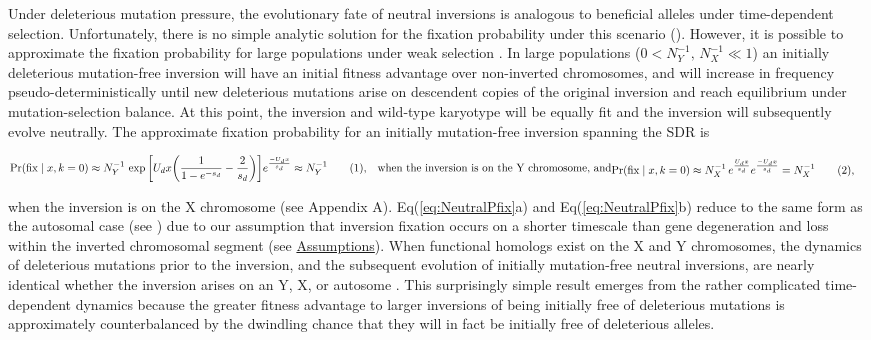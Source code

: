 \documentclass{article}
\newcommand\numberthis{\addtocounter{equation}{1}\tag{\theequation}}
\begin{document}
Under deleterious mutation pressure, the evolutionary fate of neutral inversions is analogous to beneficial alleles under time-dependent selection. Unfortunately, there is no simple analytic solution for the fixation probability under this scenario (\citealt{OhtaKojima1968, KimuraOhta1970, UeckerHermisson2011, Waxman2011}). However, it is possible to approximate the fixation probability for large populations under weak selection \citep{ConnallonOlito2020}. In large populations ($0 < N_Y^{-1},\, N_X^{-1} \ll 1$) an initially deleterious mutation-free inversion will have an initial fitness advantage over non-inverted chromosomes, and will increase in frequency pseudo-deterministically until new deleterious mutations arise on descendent copies of the original inversion and reach equilibrium under mutation-selection balance. At this point, the inversion and wild-type karyotype will be equally fit and the inversion will subsequently evolve neutrally. The approximate fixation probability for an initially mutation-free inversion spanning the SDR is

\begin{subequations}\label{eq:NeutralPfix}
	\begin{align*}
		\Pr(\text{fix} \mid x, k = 0) &\approx N^{-1}_Y \, \exp \bigg[ U_d x \bigg( \frac{1}{1 - e^{-s_d} } - \frac{2}{s_d} \bigg) \bigg] e^{\frac{-U_d x}{s_d}} \approx N^{-1}_Y \numberthis,
	\end{align*}
	\text{when the inversion is on the Y chromosome, and}
	\begin{align*}
		\Pr(\text{fix} \mid x, k = 0)&\approx N^{-1}_X \, e^{\frac{U_d x}{s_d}} e^{\frac{-U_d x}{s_d}} = N^{-1}_X \numberthis, 
	\end{align*}
\end{subequations}

\noindent when the inversion is on the X chromosome (see Appendix A). Eq(\ref{eq:NeutralPfix}a) and Eq(\ref{eq:NeutralPfix}b) reduce to the same form as the autosomal case (see \citealt{Nei1967, ConnallonOlito2020}) due to our assumption that inversion fixation occurs on a shorter timescale than gene degeneration and loss within the inverted chromosomal segment (see \hyperref[sec:assumptions]{Assumptions}). When functional homologs exist on the X and Y chromosomes, the dynamics of deleterious mutations prior to the inversion, and the subsequent evolution of initially mutation-free neutral inversions, are nearly identical whether the inversion arises on an Y, X, or autosome \citet{ConnallonOlito2020}. This surprisingly simple result emerges from the rather complicated time-dependent dynamics because the greater fitness advantage to larger inversions of being initially free of deleterious mutations is approximately counterbalanced by the dwindling chance that they will in fact be initially free of deleterious alleles. \vspace{12pt}
\end{document}
